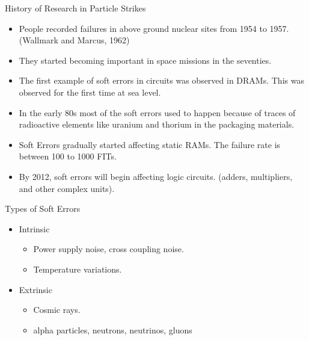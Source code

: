 \documentclass{beamer}
\begin{document}
\begin{frame}[shrink=10]{History of Research in Particle Strikes}
 \begin{itemize}
  \item People recorded failures in above ground nuclear sites from 1954 to 1957. (Wallmark and Marcus, 1962)
  \item They started becoming important in space missions in the seventies.
  \item The first example of soft errors in circuits was observed in DRAMs. This was observed for the first time
	at sea level.
  \item In the early 80s most of the soft errors used to happen because of traces of radioactive elements like uranium and thorium
        in the packaging materials.
  \item Soft Errors gradually started affecting static RAMs. The failure rate is between 100 to 1000 FITs. 
  \item By 2012, soft errors will begin affecting logic circuits. (adders, multipliers, and other complex units).
 \end{itemize}
\end{frame}

\begin{frame}{Types of Soft Errors}
  \begin{itemize}
   \item Intrinsic
      \begin{itemize}
	\item Power supply noise, cross coupling noise.
	\item Temperature variations.
      \end{itemize}
    \item Extrinsic
      \begin{itemize}
	\item Cosmic rays.
	\item alpha particles, neutrons, neutrinos, gluons
      \end{itemize}
  \end{itemize}

\end{frame}
\end{document}
